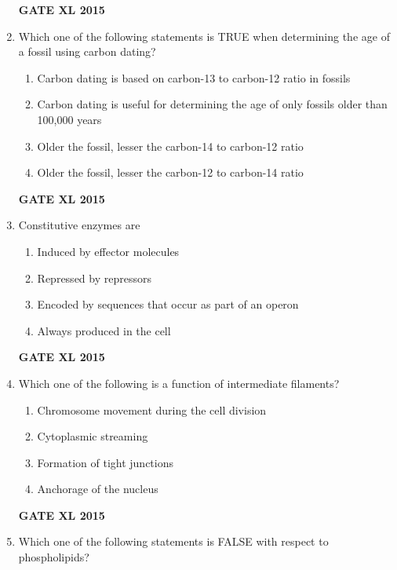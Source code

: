 \documentclass[journal,12pt,onecolumn]{IEEEtran}
\begin{document}
\begin{enumerate}
\begin{enumerate}
    \end{enumerate}
\begin{flushright}\textbf{GATE XL 2015}\end{flushright}
\item Which one of the following statements is TRUE when determining the age of a fossil using carbon dating?
    \begin{enumerate}
            \item Carbon dating is based on carbon-13 to carbon-12 ratio in fossils
	    \item Carbon dating is useful for determining the age of only fossils older than 100,000 years
	    \item Older the fossil, lesser the carbon-14 to carbon-12 ratio
            \item Older the fossil, lesser the carbon-12 to carbon-14 ratio
    \end{enumerate}
\begin{flushright}\textbf{GATE XL 2015}\end{flushright}
\item Constitutive enzymes are
    \begin{enumerate}
            \item Induced by effector molecules
	    \item Repressed by repressors
	    \item Encoded by sequences that occur as part of an operon
            \item Always produced in the cell
    \end{enumerate}
\begin{flushright}\textbf{GATE XL 2015}\end{flushright}
\item Which one of the following is a function of intermediate filaments?
    \begin{enumerate}
            \item Chromosome movement during the cell division
	    \item Cytoplasmic streaming
	    \item Formation of tight junctions
            \item Anchorage of the nucleus
    \end{enumerate}
\begin{flushright}\textbf{GATE XL 2015}\end{flushright}
\item Which one of the following statements is FALSE with respect to phospholipids?

\end{enumerate}
\end{document}
